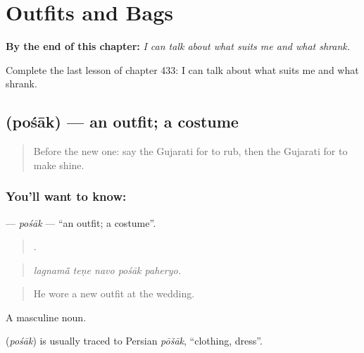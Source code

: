 
\chapter{Outfits and Bags}
\label{ch:gu-outfits-and-bags}

\begin{chapteropening}
\textbf{By the end of this chapter:} \emph{I can talk about what suits me and what shrank.}

Complete the last lesson of chapter 433: I can talk about what suits me and what shrank.
\end{chapteropening}

\section[\texorpdfstring{\gu{પોશાક} (pośāk)}{પોશાક (pośāk)}]{ (pośāk) — an outfit; a costume}

\label{lesson:GU-C433-posak}



\begin{quote}
Before the new one: say the Gujarati for to rub, then the Gujarati for to make shine.
\end{quote}

\subsection*{You'll want to know: }
\textbf{} — \emph{pośāk} — \textquotedblleft{}an outfit; a costume\textquotedblright{}.

\begin{quote}
    .
\end{quote}

\begin{quote}
\emph{lagnamā̃ teṇe navo pośāk paheryo.}
\end{quote}

\begin{quote}
He wore a new outfit at the wedding.
\end{quote}

A masculine noun.

\begin{cousinweb}
\textbf{} (\emph{pośāk}) is usually traced to Persian \emph{pōšāk}, \textquotedblleft{}clothing, dress\textquotedblright{}.
\end{cousinweb}

